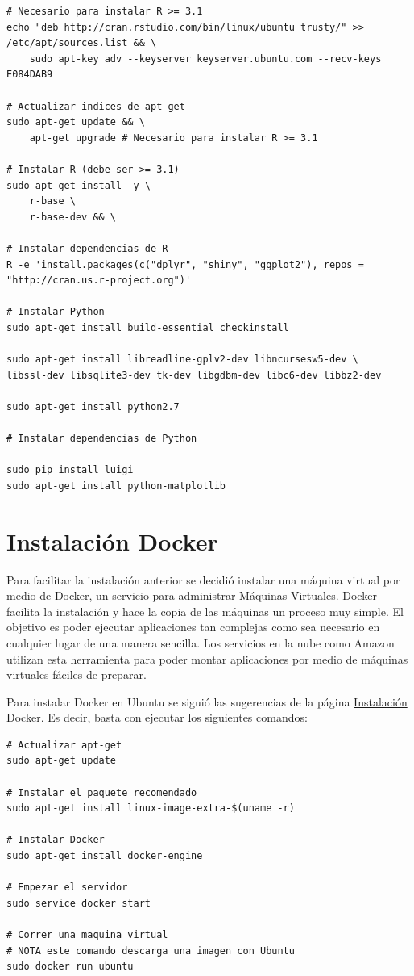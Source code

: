 \begin{lstlisting}
# Necesario para instalar R >= 3.1
echo "deb http://cran.rstudio.com/bin/linux/ubuntu trusty/" >> /etc/apt/sources.list && \
	sudo apt-key adv --keyserver keyserver.ubuntu.com --recv-keys E084DAB9

# Actualizar indices de apt-get
sudo apt-get update && \
	apt-get upgrade # Necesario para instalar R >= 3.1

# Instalar R (debe ser >= 3.1)
sudo apt-get install -y \
	r-base \
	r-base-dev && \
	
# Instalar dependencias de R
R -e 'install.packages(c("dplyr", "shiny", "ggplot2"), repos = "http://cran.us.r-project.org")'

# Instalar Python
sudo apt-get install build-essential checkinstall

sudo apt-get install libreadline-gplv2-dev libncursesw5-dev \
libssl-dev libsqlite3-dev tk-dev libgdbm-dev libc6-dev libbz2-dev

sudo apt-get install python2.7

# Instalar dependencias de Python

sudo pip install luigi
sudo apt-get install python-matplotlib
\end{lstlisting}

\section{Instalación Docker}

Para facilitar la instalación anterior se decidió instalar una máquina virtual por medio de Docker, un servicio para administrar Máquinas Virtuales. Docker facilita la instalación y hace la copia de las máquinas un proceso muy simple. El objetivo es poder ejecutar aplicaciones tan complejas como sea necesario en cualquier lugar de una manera sencilla. Los servicios en la nube como Amazon utilizan esta herramienta para poder montar aplicaciones por medio de máquinas virtuales fáciles de preparar.

Para instalar Docker en Ubuntu se siguió las sugerencias de la página \href{http://docs.docker.com/engine/installation/ubuntulinux/}{Instalación Docker}. Es decir, basta con ejecutar los siguientes comandos:

\begin{lstlisting}
# Actualizar apt-get
sudo apt-get update

# Instalar el paquete recomendado
sudo apt-get install linux-image-extra-$(uname -r)

# Instalar Docker
sudo apt-get install docker-engine

# Empezar el servidor
sudo service docker start

# Correr una maquina virtual
# NOTA este comando descarga una imagen con Ubuntu
sudo docker run ubuntu
\end{lstlisting}

